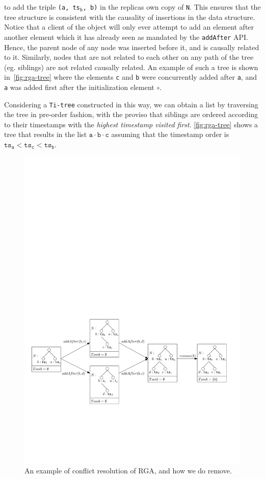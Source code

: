 to add the triple \lstinline|(a, ts|$_{\mathtt{b}}$\lstinline|, b)|
in the replicas own copy of \lstinline|N|.
%
This ensures that the tree structure is consistent with the causality
of insertions in the data structure.
%
Notice that a client of the object will only ever attempt to add an
element after another element which it has already seen as mandated by
the \lstinline|addAfter| API.
%
Hence, the parent node of any node was inserted before it, and is
causally related to it.
%
Similarly, nodes that are not related to each other on any path of
the tree (eg. siblings) are not related causally related.
%
An example of such a tree is shown in~\autoref{fig:rga-tree} where the
elements \lstinline|c| and \lstinline|b| were concurrently added after
\lstinline|a|, and \lstinline|a| was added first after the
initialization element $\circ$.

 Considering a \lstinline|Ti-tree| constructed in this way, we can
obtain a list by traversing the tree in pre-order fashion, with the
proviso that siblings are ordered according to their timestamps with
the \emph{highest timestamp visited first}.
%
\autoref{fig:rga-tree} shows a tree that results in the list
$\mathtt{a \cdot b \cdot c}$ assuming that the timestamp order is $\mathtt{ts_a
  < ts_c < ts_b}$.


\begin{figure}[t]
  \centering
  \includegraphics[width=0.85 \textwidth]{figures/HowRGAWork.pdf}
  \caption{An example of conflict resolution of RGA, and how we do remove.}
  \label{fig:how RGA works}
\end{figure}


